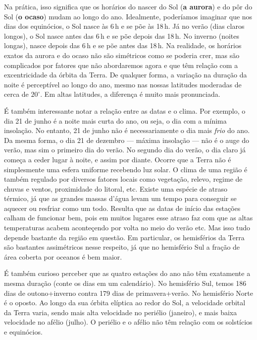 Na prática, isso significa que os horários do nascer do Sol (\textbf{a aurora}) e do pôr do Sol (\textbf{o ocaso}) mudam ao longo do ano. Idealmente, poderíamos imaginar que nos dias dos equinócios, o Sol nasce às 6\,h e se põe às 18\,h. Já no verão (dias claros longos), o Sol nasce antes das 6\,h e se põe depois das 18\,h. No inverno (noites longas), nasce depois das 6\,h e se põe antes das 18\,h. Na realidade, os horários exatos da aurora e do ocaso não são simétricos como se poderia crer, mas são complicados por fatores que não abordaremos agora e que têm relação com a excentricidade da órbita da Terra. De qualquer forma, a variação na duração da noite é perceptível ao longo do ano, mesmo nas nossas latitudes moderadas de cerca de $20^{\circ}$. Em altas latitudes, a diferença é muito mais pronunciada.

É também interessante notar a relação entre as datas e o clima. Por exemplo, o dia 21 de junho é a noite mais curta do ano, ou seja, o dia com a mínima insolação. No entanto, 21 de junho não é necessariamente o dia mais \textit{frio} do ano. Da mesma forma, o dia 21 de dezembro --- máxima insolação --- não é o auge do verão, mas sim o primeiro dia do verão. No segundo dia do verão, o dia claro já começa a ceder lugar à noite, e assim por diante. Ocorre que a Terra não é simplesmente uma esfera uniforme recebendo luz solar. O clima de uma região é também regulado por diversos fatores locais como vegetação, relevo, regime de chuvas e ventos, proximidade do litoral, etc. Existe uma espécie de atraso térmico, já que as grandes massas d'água levam um tempo para conseguir se aquecer ou resfriar como um todo. Resulta que as datas de início das estações calham de funcionar bem, pois em muitos lugares esse atraso faz com que as altas temperaturas acabem aconteçendo por volta no meio do verão etc. Mas isso tudo depende bastante da região em questão. Em particular, os hemisférios da Terra são bastantes assimétricos nesse respeito, já que no hemisfério Sul a fração de área coberta por oceanos é bem maior.

É também curioso perceber que as quatro estações do ano não têm exatamente a mesma duração (conte os dias em um calendário). No hemisfério Sul, temos 186 dias de outono+inverno contra 179 dias de primavera+verão. No hemisfério Norte é o oposto. Ao longo da sua órbita elíptica ao redor do Sol, a velocidade orbital da Terra varia, sendo mais alta velocidade no periélio (janeiro), e mais baixa velocidade no afélio (julho). O periélio e o afélio não têm relação com os solstícios e equinócios.

